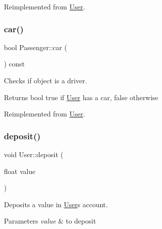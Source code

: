 Reimplemented from \hyperlink{group___user_ga86635e817828c81ee5e18b2e802e3218}{User}.

\mbox{\label{group___user_gaeb69b29d53079577e41f070da1f442dd}} 
\subsubsection{\texorpdfstring{car()}{car()}\hspace{0.1cm}{\footnotesize\ttfamily [3/3]}}
{\footnotesize\ttfamily bool Passenger\+::car (\begin{DoxyParamCaption}{ }\end{DoxyParamCaption}) const\hspace{0.3cm}{\ttfamily [virtual]}}



Checks if object is a driver. 

\begin{DoxyReturn}{Returns}
bool true if \hyperlink{class_user}{User} has a car, false otherwise 
\end{DoxyReturn}


Reimplemented from \hyperlink{group___user_ga86635e817828c81ee5e18b2e802e3218}{User}.

\mbox{\label{group___user_gafe73f0b48d4aa29e9205f706a21b7068}} 
\subsubsection{\texorpdfstring{deposit()}{deposit()}}
{\footnotesize\ttfamily void User\+::deposit (\begin{DoxyParamCaption}\item[{float}]{value }\end{DoxyParamCaption})}



Deposits a value in \hyperlink{class_user}{User}\textquotesingle{}s account. 


\begin{DoxyParams}{Parameters}
{\em value} & to deposit \\
\hline
\end{DoxyParams}
\mbox{\label{group___user_ga781d40c6af9f399284149602ead32171}} 
